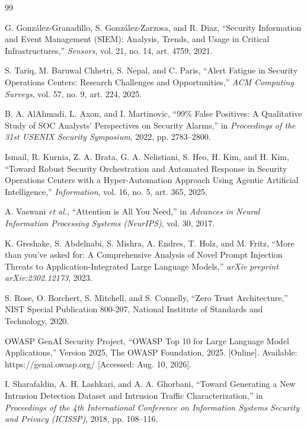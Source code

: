 \documentclass[12pt,a4paper]{report}
\begin{document}
\begin{thebibliography}{99}
\setlength{\itemsep}{0pt}
\setlength{\parskip}{0pt}

G. González-Granadillo, S. González-Zarzosa, and R. Diaz, ``Security Information and Event Management (SIEM): Analysis, Trends, and Usage in Critical Infrastructures,'' \textit{Sensors}, vol. 21, no. 14, art. 4759, 2021.

S. Tariq, M. Baruwal Chhetri, S. Nepal, and C. Paris, ``Alert Fatigue in Security Operations Centers: Research Challenges and Opportunities,'' \textit{ACM Computing Surveys}, vol. 57, no. 9, art. 224, 2025.

B. A. AlAhmadi, L. Axon, and I. Martinovic, ``99\% False Positives: A Qualitative Study of SOC Analysts' Perspectives on Security Alarms,'' in \textit{Proceedings of the 31st USENIX Security Symposium}, 2022, pp. 2783--2800.

Ismail, R. Kurnia, Z. A. Brata, G. A. Nelistiani, S. Heo, H. Kim, and H. Kim, ``Toward Robust Security Orchestration and Automated Response in Security Operations Centers with a Hyper-Automation Approach Using Agentic Artificial Intelligence,'' \textit{Information}, vol. 16, no. 5, art. 365, 2025.

A. Vaswani \textit{et al.}, ``Attention is All You Need,'' in \textit{Advances in Neural Information Processing Systems (NeurIPS)}, vol. 30, 2017.

K. Greshake, S. Abdelnabi, S. Mishra, A. Endres, T. Holz, and M. Fritz, ``More than you've asked for: A Comprehensive Analysis of Novel Prompt Injection Threats to Application-Integrated Large Language Models,'' \textit{arXiv preprint arXiv:2302.12173}, 2023.

S. Rose, O. Borchert, S. Mitchell, and S. Connelly, ``Zero Trust Architecture,'' NIST Special Publication 800-207, National Institute of Standards and Technology, 2020.

OWASP GenAI Security Project, ``OWASP Top 10 for Large Language Model Applications,'' Version 2025, The OWASP Foundation, 2025. [Online]. Available: https://genai.owasp.org/ [Accessed: Aug. 10, 2026].

I. Sharafaldin, A. H. Lashkari, and A. A. Ghorbani, ``Toward Generating a New Intrusion Detection Dataset and Intrusion Traffic Characterization,'' in \textit{Proceedings of the 4th International Conference on Information Systems Security and Privacy (ICISSP)}, 2018, pp. 108--116.


\end{thebibliography}
\end{document}

